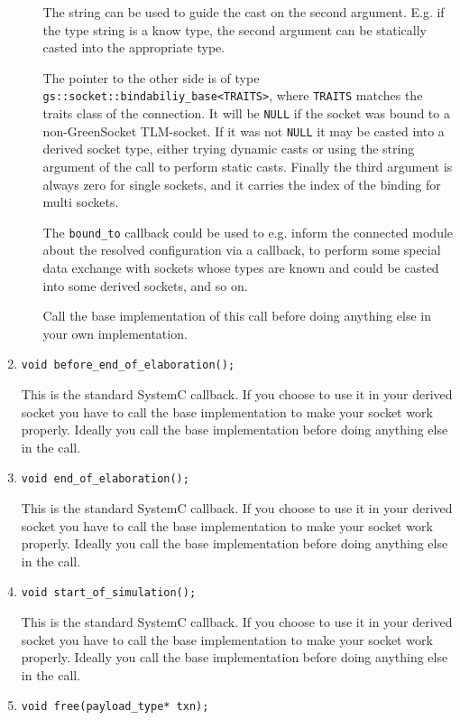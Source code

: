 \documentclass[a4paper,10pt]{article}          %
\begin{document}
\begin{enumerate}
\begin{enumerate}
The string can be used to guide the cast on the second argument. E.g. if the type string is a know type, the second argument can be statically casted into the appropriate type.

The pointer to the other side is of type \verb|gs::socket::bindabiliy_base<TRAITS>|, where \verb|TRAITS| matches the traits class of the connection. It will be \verb|NULL| if the socket was bound to a non-GreenSocket TLM-socket. If it was not \verb|NULL| it may be casted into a derived socket type, either trying dynamic casts or using the string argument of the call to perform static casts. 
Finally the third argument is always zero for single sockets, and it carries the index of the binding for multi sockets.

The \verb|bound_to| callback could be used to e.g. inform the connected module about the resolved configuration via a callback, to perform some special data exchange with sockets whose types are known and could be casted into some derived sockets, and so on.

Call the base implementation of this call before doing anything else in your own implementation.
\end{enumerate}

\item
\verb|void before_end_of_elaboration();|

This is the standard SystemC callback. If you choose to use it in your derived socket you have to call the base implementation to make your socket work properly. Ideally you call the base implementation before doing anything else in the call.

\item
\verb|void end_of_elaboration();|

This is the standard SystemC callback. If you choose to use it in your derived socket you have to call the base implementation to make your socket work properly. Ideally you call the base implementation before doing anything else in the call.

\item
\verb|void start_of_simulation();|

This is the standard SystemC callback. If you choose to use it in your derived socket you have to call the base implementation to make your socket work properly. Ideally you call the base implementation before doing anything else in the call.

\item
\verb|void free(payload_type* txn);|


\end{enumerate}
\end{document}
